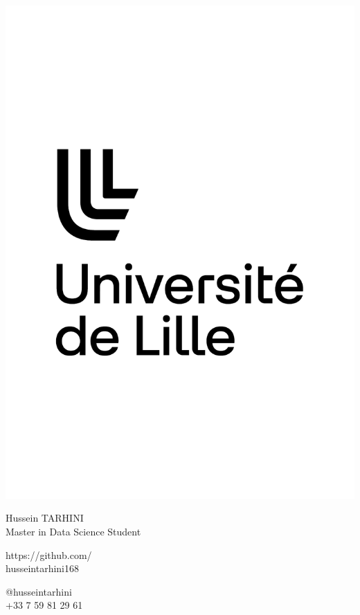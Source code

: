 \documentclass{article}
\begin{document}
\centering \includegraphics[width=.25\linewidth]{logo}\\[5pt]
\parbox{2in}{\Large \centering Hussein TARHINI\\[1pt]
\normalsize Master in Data Science Student}

\vfill
\raggedright
\begin{multicols}{2}
https://github.com/\\
husseintarhini168

\columnbreak
\raggedleft
@husseintarhini\\
 +33 7 59 81 29 61%
\end{multicols}%
\end{document}
